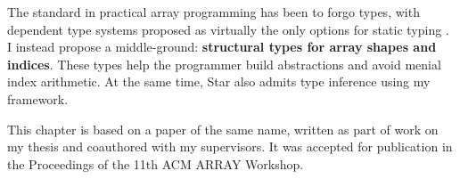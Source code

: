 The standard in practical array programming has been to forgo types, with dependent type systems proposed as virtually the only options for static typing \cite{dex}. I instead propose a middle-ground: \textbf{structural types for array shapes and indices}. These types help the programmer build abstractions and avoid menial index arithmetic. At the same time, Star also admits type inference using my framework.

This chapter is based on a paper of the same name, written as part of work on my thesis and coauthored with my supervisors. It was accepted for publication in the Proceedings of the 11th ACM ARRAY Workshop. 
